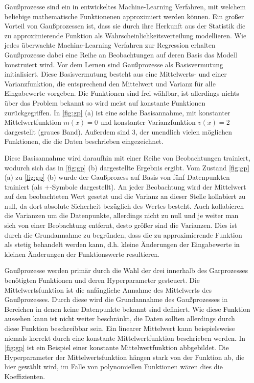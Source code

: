 Gaußprozesse sind ein in \cite{Rasmussen.2008} entwickeltes Machine-Learning Verfahren, mit welchem beliebige mathematische Funktionenen approximiert werden können.
Ein großer Vorteil von Gaußprozessen ist, dass sie durch ihre Herkunft aus der Statistik die zu approximierende Funktion als Wahrscheinlichkeitsverteilung modellieren.
Wie jedes überwachte Machine-Learning Verfahren zur Regression erhalten Gaußprozesse dabei eine Reihe an Beobachtungen auf deren Basis das Modell konstruiert wird.
Vor dem Lernen sind Gaußprozesse als Basisvermutung initialisiert.
Diese Basisvermutung besteht aus eine Mittelwerts- und einer Varianzfunktion, die entsprechend den Mittelwert und Varianz für alle Eingabewerte vorgeben.
Die Funktionen sind frei wählbar, ist allerdings nichts über das Problem bekannt so wird meist auf konstante Funktionen zurückgegriffen.
In \cref{fig:gp} (a) ist eine solche Basisannahme, mit konstanter Mittelwertfunktion $m(x)=0$ und konstanter Varianzfunktion $v(x)=2$ dargestellt (graues Band).
Außerdem sind 3, der unendlich vielen möglichen Funktionen, die die Daten beschrieben eingezeichnet.

Diese Basisannahme wird daraufhin mit einer Reihe von Beobachtungen trainiert, wodurch sich das in \cref{fig:gp} (b) dargestellte Ergebnis ergibt.
Vom Zustand \cref{fig:gp} (a) zu \cref{fig:gp} (b) wurde der Gaußprozess auf Basis von fünf Datenpunkten trainiert (als $+$-Symbole dargestellt).
An jeder Beobachtung wird der Mittelwert auf den beobachteten Wert gesetzt und die Varianz an dieser Stelle kollabiert zu null, da dort absolute Sicherheit bezüglich des Wertes besteht.
Auch kollabieren die Varianzen um die Datenpunkte, allerdings nicht zu null und je weiter man sich von einer Beobachtung entfernt, desto größer sind die Varianzen.
Dies ist durch die Grundannahme zu begründen, dass die zu approximierende Funktion als stetig behandelt werden kann, d.h. kleine Änderungen der Eingabewerte in kleinen Änderungen der Funktionswerte resultieren.

Gaußprozesse werden primär durch die Wahl der drei innerhalb des Garprozesses benötigten Funktionen und deren Hyperparameter gesteuert.
Die Mittelwertsfunktion ist die anfängliche Annahme des Mittelwerts des Gaußprozesses.
Durch diese wird die Grundannahme des Gaußprozesses in Bereichen in denen keine Datenpunkte bekannt sind definiert.
Wie diese Funktion aussehen kann ist nicht weiter beschränkt, die Daten sollten allerdings durch diese Funktion beschreibbar sein.
Ein linearer Mittelwert kann beispielsweise niemals korrekt durch eine konstante Mittelwertfunktion beschrieben werden.
In \cref{fig:gp} ist ein Beispiel einer konstante Mittelwertfunktion abbgebildet.
Die Hyperparameter der Mittelwertsfunktion hängen stark von der Funktion ab, die hier gewählt wird, im Falle von polynomiellen Funktionen wären dies die Koeffizienten.

